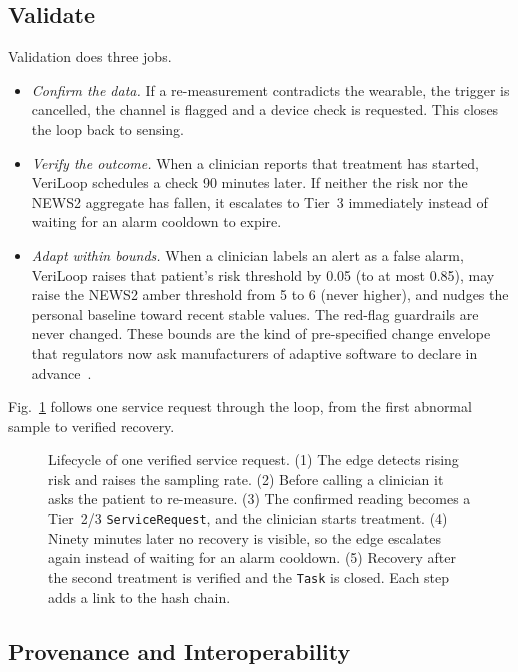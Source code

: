 \documentclass[journal]{IEEEtran}
\begin{document}
\subsection*{Validate}

Validation does three jobs.
\begin{itemize}
\item \emph{Confirm the data.} If a re-measurement contradicts the wearable, the trigger is cancelled, the channel is
flagged and a device check is requested. This closes the loop back to sensing.
\item \emph{Verify the outcome.} When a clinician reports that treatment has started, VeriLoop schedules a check 90
minutes later. If neither the risk nor the NEWS2 aggregate has fallen, it escalates to Tier~3 immediately instead of
waiting for an alarm cooldown to expire.
\item \emph{Adapt within bounds.} When a clinician labels an alert as a false alarm, VeriLoop raises that patient's
risk threshold by 0.05 (to at most 0.85), may raise the NEWS2 amber threshold from 5 to 6 (never higher), and nudges
the personal baseline toward recent stable values. The red-flag guardrails are never changed. These bounds are the
kind of pre-specified change envelope that regulators now ask manufacturers of adaptive software to declare in
advance~\cite{fda2021}.
\end{itemize}

Fig.~\ref{fig:lifecycle} follows one service request through the loop, from the first abnormal sample to verified
recovery.

\begin{figure}[t]
\centering
\resizebox{\textwidth}{!}{}
\caption{Lifecycle of one verified service request. (1) The edge detects rising risk and raises the sampling rate.
(2) Before calling a clinician it asks the patient to re-measure. (3) The confirmed reading becomes a Tier~2/3
\texttt{ServiceRequest}, and the clinician starts treatment. (4) Ninety minutes later no recovery is visible, so the
edge escalates again instead of waiting for an alarm cooldown. (5) Recovery after the second treatment is verified and
the \texttt{Task} is closed. Each step adds a link to the hash chain.}
\label{fig:lifecycle}
\end{figure}

\subsection*{Provenance and Interoperability}
\end{document}
